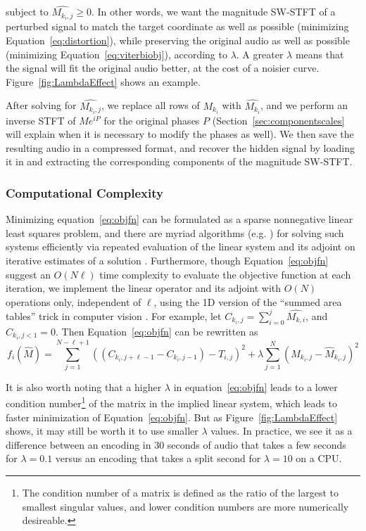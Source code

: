 \documentclass[runningheads]{llncs}
\begin{document}
subject to $\hat{M_{k_i, j}} \geq 0$.  In other words, we want the magnitude SW-STFT of a perturbed signal to match the target coordinate as well as possible (minimizing Equation~\ref{eq:distortion}), while preserving the original audio as well as possible (minimizing Equation~\ref{eq:viterbiobj}), according to $\lambda$.  A greater $\lambda$ means that the signal will fit the original audio better, at the cost of a noisier curve.  Figure~\ref{fig:LambdaEffect} shows an example.

After solving for $\hat{M_{k_i, j}}$, we replace all rows of $M_{k_i}$ with $\hat{M_{k_i}}$, and we perform an inverse STFT of $M e^{i P}$ for the original phases $P$ (Section~\ref{sec:componentscales} will explain when it is necessary to modify the phases as well).  We then save the resulting audio in a compressed format, and recover the hidden signal by loading it in and extracting the corresponding components of the magnitude SW-STFT.


\subsubsection{Computational Complexity}
\label{sec:computation}
Minimizing equation~\ref{eq:objfn} can be formulated as a sparse nonnegative linear least squares problem, and there are myriad algorithms (e.g. \cite{branch1999subspace}) for solving such systems efficiently via repeated evaluation of the linear system and its adjoint on iterative estimates of a solution .  Furthermore, though Equation~\ref{eq:objfn} suggest an $O(N \ell)$ time complexity to evaluate the objective function at each iteration, we implement the linear operator and its adjoint with $O(N)$ operations only, independent of $\ell$, using the 1D version of the ``summed area tables'' trick in computer vision \cite{lewisfast}.  For example, let $C_{k_i, j} = \sum_{i=0}^{j} \hat{M_{k, i}}$, and $C_{k_i, j < 1} = 0$.  Then Equation~\ref{eq:objfn} can be rewritten as 
\begin{equation}
  \label{eq:objfncumusum}
  f_i(\hat{M}) = \sum_{j=1}^{N-\ell+1} \left( (C_{k_i, j+\ell-1}-C_{k_i, j-1}) - T_{i, j} \right)^2 + \lambda \sum_{j=1}^N \left( M_{k_i, j} - \hat{M}_{k_i, j} \right)^2
\end{equation}


It is also worth noting that a higher $\lambda$ in equation~\ref{eq:objfn} leads to a lower condition number\footnote{The condition number of a matrix is defined as the ratio of the largest to smallest singular values, and lower condition numbers are more numerically desireable.} of the matrix in the implied linear system, which leads to faster minimization of Equation~\ref{eq:objfn}.  But as Figure~\ref{fig:LambdaEffect} shows, it may still be worth it to use smaller $\lambda$ values.  In practice, we see it as a difference between an encoding in 30 seconds of audio that takes a few seconds for $\lambda=0.1$ versus an encoding that takes a split second for $\lambda=10$ on a CPU.
\end{document}

